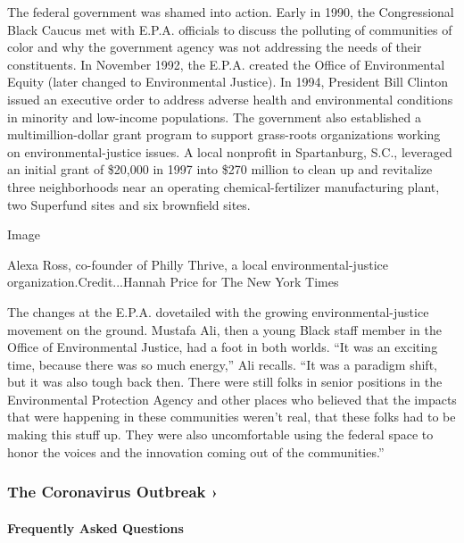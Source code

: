 The federal government was shamed into action. Early in 1990, the
Congressional Black Caucus met with E.P.A. officials to discuss the
polluting of communities of color and why the government agency was not
addressing the needs of their constituents. In November 1992, the E.P.A.
created the Office of Environmental Equity (later changed to
Environmental Justice). In 1994, President Bill Clinton issued an
executive order to address adverse health and environmental conditions
in minority and low-income populations. The government also established
a multimillion-dollar grant program to support grass-roots organizations
working on environmental-justice issues. A local nonprofit in
Spartanburg, S.C., leveraged an initial grant of \$20,000 in 1997 into
\$270 million to clean up and revitalize three neighborhoods near an
operating chemical-fertilizer manufacturing plant, two Superfund sites
and six brownfield sites.

Image

Alexa Ross, co-founder of Philly Thrive, a local environmental-justice
organization.Credit...Hannah Price for The New York Times

The changes at the E.P.A. dovetailed with the growing
environmental-justice movement on the ground. Mustafa Ali, then a young
Black staff member in the Office of Environmental Justice, had a foot in
both worlds. ``It was an exciting time, because there was so much
energy,'' Ali recalls. ``It was a paradigm shift, but it was also tough
back then. There were still folks in senior positions in the
Environmental Protection Agency and other places who believed that the
impacts that were happening in these communities weren't real, that
these folks had to be making this stuff up. They were also uncomfortable
using the federal space to honor the voices and the innovation coming
out of the communities.''

\href{https://www.nytimes.com/news-event/coronavirus?action=click\&pgtype=Article\&state=default\&region=MAIN_CONTENT_3\&context=storylines_faq}{}

\hypertarget{the-coronavirus-outbreak-}{%
\subsubsection{The Coronavirus Outbreak
›}\label{the-coronavirus-outbreak-}}

\hypertarget{frequently-asked-questions}{%
\paragraph{Frequently Asked
Questions}\label{frequently-asked-questions}}

